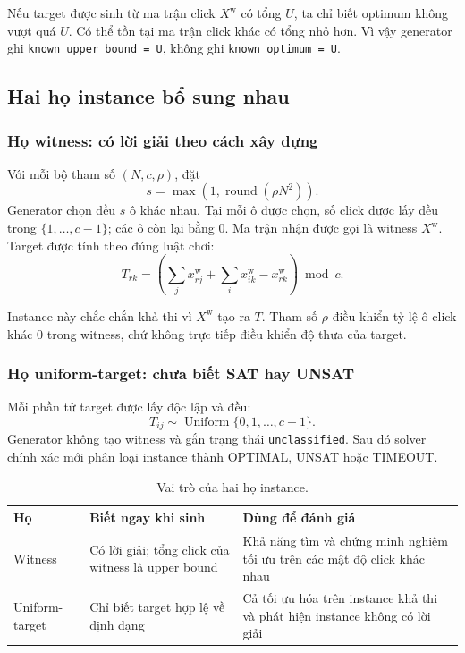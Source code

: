 \documentclass[11pt,a4paper]{article}
\begin{document}
\begin{notebox}
Nếu target được sinh từ ma trận click $X^{\mathrm w}$ có tổng $U$, ta chỉ
biết optimum không vượt quá $U$. Có thể tồn tại ma trận click khác có tổng
nhỏ hơn. Vì vậy generator ghi \texttt{known\_upper\_bound = U}, không ghi
\texttt{known\_optimum = U}.
\end{notebox}

\subsection{Hai họ instance bổ sung nhau}

\subsubsection{Họ witness: có lời giải theo cách xây dựng}

Với mỗi bộ tham số $(N,c,\rho)$, đặt
\[
  s=\max\!\left(1,\operatorname{round}(\rho N^2)\right).
\]
Generator chọn đều $s$ ô khác nhau. Tại mỗi ô được chọn, số click được lấy
đều trong $\{1,\ldots,c-1\}$; các ô còn lại bằng 0. Ma trận nhận được gọi
là witness $X^{\mathrm w}$. Target được tính theo đúng luật chơi:
\begin{equation}\label{eq:data-witness}
  T_{rk}=\left(
    \sum_j x^{\mathrm w}_{rj}
    +\sum_i x^{\mathrm w}_{ik}
    -x^{\mathrm w}_{rk}
  \right)\bmod c.
\end{equation}

Instance này chắc chắn khả thi vì $X^{\mathrm w}$ tạo ra $T$. Tham số
$\rho$ điều khiển tỷ lệ ô click khác 0 trong witness, chứ không trực tiếp
điều khiển độ thưa của target.

\subsubsection{Họ uniform-target: chưa biết SAT hay UNSAT}

Mỗi phần tử target được lấy độc lập và đều:
\begin{equation}\label{eq:data-uniform}
  T_{ij}\sim\operatorname{Uniform}\{0,1,\ldots,c-1\}.
\end{equation}
Generator không tạo witness và gắn trạng thái
\texttt{unclassified}. Sau đó solver chính xác mới phân loại instance thành
OPTIMAL, UNSAT hoặc TIMEOUT.

\begin{table}[H]
\centering
\caption{Vai trò của hai họ instance.}
\label{tab:data-families}
\begin{tabularx}{\textwidth}{@{}l X X@{}}
\toprule
\textbf{Họ} & \textbf{Biết ngay khi sinh} & \textbf{Dùng để đánh giá} \\
\midrule
Witness
& Có lời giải; tổng click của witness là upper bound
& Khả năng tìm và chứng minh nghiệm tối ưu trên các mật độ click khác nhau \\
Uniform-target
& Chỉ biết target hợp lệ về định dạng
& Cả tối ưu hóa trên instance khả thi và phát hiện instance không có lời giải \\
\bottomrule
\end{tabularx}
\end{table}
\end{document}
